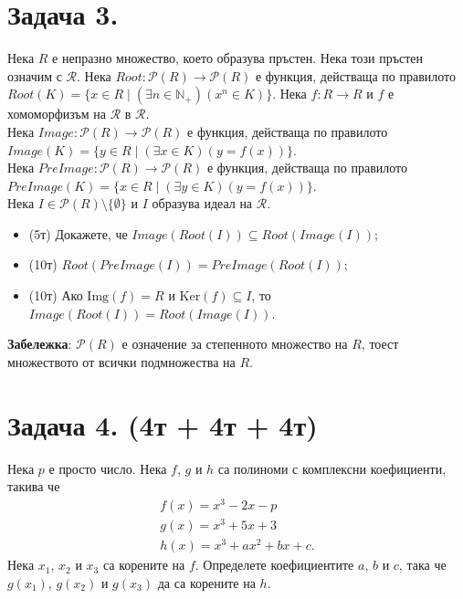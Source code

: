 \documentclass[17pt]{extarticle}
\begin{document}
\newpage

\section*{Задача 3.}
Нека \(R\) е непразно множество, което образува пръстен. Нека този пръстен означим с \(\mathcal R\).
Нека \(Root : \mathcal{P}(R) \to \mathcal{P}(R)\) е функция, действаща по правилото
\(Root(K) = \{x \in R \mid (\exists n \in \mathbb N_+)(x^{n} \in K)\}\).
Нека \(f : R \to R\) и \(f\) е хомоморфизъм на \(\mathcal R\) в \(\mathcal R\). \\
Нека \(Image : \mathcal{P}(R) \to \mathcal{P}(R)\) е функция, действаща по правилото
\(Image(K) = \{y \in R \mid (\exists x \in K)(y = f(x))\}\). \\
Нека \(PreImage : \mathcal{P}(R) \to \mathcal{P}(R)\) е функция, действаща по правилото
\(PreImage(K) = \{x \in R \mid (\exists y \in K)(y = f(x))\}\). \\
Нека \(I \in \mathcal{P}(R) \setminus \{\emptyset\}\) и \(I\) образува идеал на \(\mathcal R\).

\begin{itemize}
    \item (5т) Докажете, че \(Image(Root(I)) \subseteq Root(Image(I))\);
    \item (10т) \(Root(PreImage(I)) = PreImage(Root(I))\);
    \item (10т) Ако \(\mathrm{Img}(f) = R\) и \(\mathrm{Ker}(f) \subseteq I\), то  \(Image(Root(I)) = Root(Image(I))\).
\end{itemize}

\textbf{Забележка}: \(\mathcal{P}(R)\) е означение за степенното множество на \(R\), тоест множеството от всички подмножества на \(R\).

\newpage

\section*{Задача 4. (4т + 4т + 4т)}
Нека \(p\) е просто число.
Нека \(f\), \(g\) и \(h\) са полиноми с комплексни коефициенти, такива че
\begin{align*}
    f(x) = x^3 - 2x - p \\
    g(x) = x^3 + 5x + 3 \\
    h(x) = x^3 + ax^2 + bx + c.
\end{align*}
Нека \(x_1\), \(x_2\) и \(x_3\) са корените на \(f\).
Определете коефициентите \(a\), \(b\) и \(c\), така че \(g(x_1)\), \(g(x_2)\) и \(g(x_3)\) да са корените на \(h\).
\end{document}
